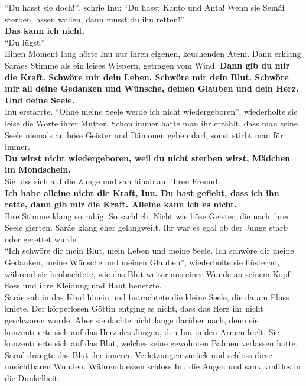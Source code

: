 \documentclass[a4paper,12pt]{book}
\begin{document}
``Du hasst sie doch!'', schrie Inu: ``Du hasst Kanto und Anta! Wenn sie Semái sterben lassen 
wollen, dann musst du ihn retten!''\\
\textbf{Das kann ich nicht.}\\
``Du lügst.''\\
Einen Moment lang hörte Inu nur ihren eigenen, keuchenden Atem. Dann erklang Saráes Stimme als ein 
leises Wispern, getragen vom Wind. \textbf{Dann gib du mir die Kraft. Schwöre mir dein Leben. 
Schwöre mir dein Blut. Schwöre mir all deine Gedanken und Wünsche, deinen Glauben und dein Herz. 
Und deine Seele.}\\
Inu erstarrte. ``Ohne meine Seele werde ich nicht wiedergeboren'', wiederholte sie leise die Worte 
ihrer Mutter. Schon immer hatte man ihr erzählt, dass man seine Seele niemals an böse Geister und 
Dämonen geben darf, sonst stirbt man für immer.\\
\textbf{Du wirst nicht wiedergeboren, weil du nicht sterben wirst, Mädchen im Mondschein.}\\
Sie biss sich auf die Zunge und sah hinab auf ihren Freund. \\
\textbf{Ich habe alleine nicht die Kraft, Inu. Du hast gefleht, dass ich ihn rette, dann gib mir 
die Kraft. Alleine kann ich es nicht.}\\
Ihre Stimme klang so ruhig. So sachlich. Nicht wie böse Geister, die nach ihrer Seele gierten. 
Saráe klang eher gelangweilt. Ihr war es egal ob der Junge starb oder gerettet wurde.\\
``Ich schwöre dir mein Blut, mein Leben und meine Seele. Ich schwöre dir meine Gedanken, meine 
Wünsche und meinen Glauben'', wiederholte sie flüsternd, während sie beobachtete, wie das Blut 
weiter aus einer Wunde an seinem Kopf floss und ihre Kleidung und Haut benetzte.\\
Saráe sah in das Kind hinein und betrachtete die kleine Seele, die da am Fluss kniete. Der 
körperlosen Göttin entging es nicht, dass das Herz ihr nicht geschworen wurde. Aber sie dachte 
nicht lange darüber nach, denn sie konzentrierte sich auf das Herz des Jungen, den Inu in den Armen 
hielt. Sie konzentrierte sich auf das Blut, welches seine gewohnten Bahnen verlassen hatte. Saraé 
drängte das Blut der inneren Verletzungen zurück und schloss diese unsichtbaren Wunden. 
Währenddessen schloss Inu die Augen und sank kraftlos in die Dunkelheit. \\
\end{document}
